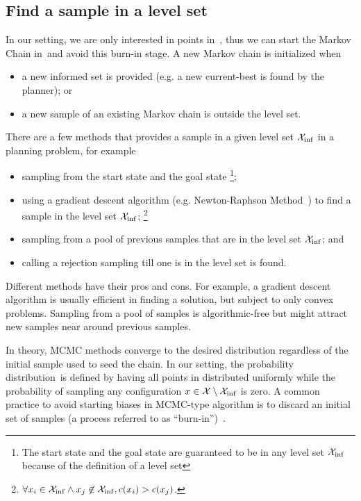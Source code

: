 \documentclass[letterpaper, 10 pt, conference]{ieeeconf}  %
\begin{document}
\subsection{Find a sample in a level set}

In our setting, we are only interested in points in~\Cinf, thus we can start the Markov Chain in~\Cinf and avoid this burn-in stage. 
A new Markov chain is initialized when 
\begin{itemize}
	\item a new informed set is provided (e.g. a new current-best is found by the planner); or
	\item a new sample of an existing Markov chain is outside the level set.
\end{itemize}
There are a few methods that provides a sample in a given level set $ \mathcal{X}_{\rm {inf}} $ in a planning problem, for example
\begin{itemize}
	\item sampling from the start state and the goal state
	\footnote{The start state and the goal state are guaranteed to be in any level set $ \mathcal{X}_{\rm {inf}} $ because of the definition of a level set};
	\item using a gradient descent algorithm (e.g. Newton-Raphson Method~\cite{RT06}) to find a sample in the level set $ \mathcal{X}_{\rm {inf}} $; 
	\footnote{ $ \forall x_i \in \mathcal{X}_{\rm {inf}} \land x_j \not\in \mathcal{X}_{\rm {inf}}, c( x_i ) > c ( x_j ) $. }
	\item sampling from a pool of previous samples that are in the level set $ \mathcal{X}_{\rm {inf}} $; and
	\item calling a rejection sampling till one is in the level set is found.
\end{itemize}

Different methods have their pros and cons.
For example, a gradient descent algorithm is usually efficient in finding a solution, but subject to only convex problems.
Sampling from a pool of samples is algorithmic-free but might attract new samples near around previous samples.

In theory, MCMC methods converge to the desired distribution regardless of the initial sample used to seed the chain.
In our setting, the probability distribution~\Pinf is defined by having all points in \Cinf distributed uniformly
while 
the probability of sampling any configuration $x \in \mathcal{X} \setminus \mathcal{X}_{\rm {inf}}$ is zero.
A common practice to avoid starting biases in MCMC-type algorithm is to discard an initial set of samples (a process referred to as ``burn-in'')~\cite{ADDJ03}. 
\end{document}
